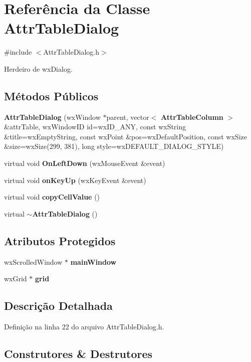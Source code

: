 \section{Referência da Classe Attr\+Table\+Dialog}
\label{class_attr_table_dialog}


{\ttfamily \#include $<$Attr\+Table\+Dialog.\+h$>$}



Herdeiro de wx\+Dialog.

\subsection*{Métodos Públicos}
\begin{DoxyCompactItemize}
\item 
{\bf Attr\+Table\+Dialog} (wx\+Window $\ast$parent, vector$<$ {\bf Attr\+Table\+Column} $>$ \&attr\+Table, wx\+Window\+ID id=wx\+I\+D\+\_\+\+A\+NY, const wx\+String \&title=wx\+Empty\+String, const wx\+Point \&pos=wx\+Default\+Position, const wx\+Size \&size=wx\+Size(299, 381), long style=wx\+D\+E\+F\+A\+U\+L\+T\+\_\+\+D\+I\+A\+L\+O\+G\+\_\+\+S\+T\+Y\+LE)
\item 
virtual void {\bf On\+Left\+Down} (wx\+Mouse\+Event \&event)
\item 
virtual void {\bf on\+Key\+Up} (wx\+Key\+Event \&event)
\item 
virtual void {\bf copy\+Cell\+Value} ()
\item 
virtual {\bf $\sim$\+Attr\+Table\+Dialog} ()
\end{DoxyCompactItemize}
\subsection*{Atributos Protegidos}
\begin{DoxyCompactItemize}
\item 
wx\+Scrolled\+Window $\ast$ {\bf main\+Window}
\item 
wx\+Grid $\ast$ {\bf grid}
\end{DoxyCompactItemize}


\subsection{Descrição Detalhada}


Definição na linha 22 do arquivo Attr\+Table\+Dialog.\+h.



\subsection{Construtores \& Destrutores}
